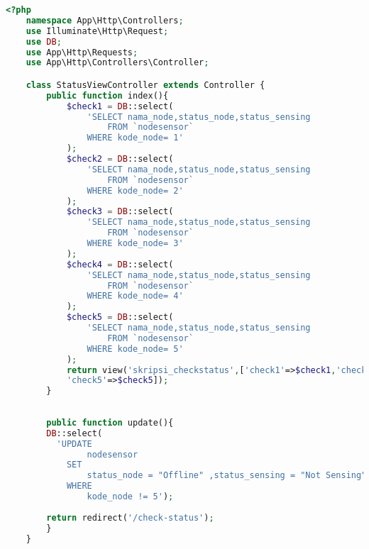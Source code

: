 \begin{lstlisting}[language=PHP, caption=StatusViewController.php]
<?php
    namespace App\Http\Controllers;
    use Illuminate\Http\Request;
    use DB;
    use App\Http\Requests;
    use App\Http\Controllers\Controller;

    class StatusViewController extends Controller {
        public function index(){
            $check1 = DB::select(
                'SELECT nama_node,status_node,status_sensing 
                    FROM `nodesensor` 
                WHERE kode_node= 1'
            );
            $check2 = DB::select(
                'SELECT nama_node,status_node,status_sensing 
                    FROM `nodesensor` 
                WHERE kode_node= 2'
            );
            $check3 = DB::select(
                'SELECT nama_node,status_node,status_sensing 
                    FROM `nodesensor` 
                WHERE kode_node= 3'
            );
            $check4 = DB::select(
                'SELECT nama_node,status_node,status_sensing 
                    FROM `nodesensor` 
                WHERE kode_node= 4'
            );
            $check5 = DB::select(
                'SELECT nama_node,status_node,status_sensing 
                    FROM `nodesensor` 
                WHERE kode_node= 5'
            );
            return view('skripsi_checkstatus',['check1'=>$check1,'check2'=>$check2,'check3'=>$check3,'check4'=>$check4,
            'check5'=>$check5]); 
        }
    
        
        public function update(){
        DB::select(
          'UPDATE 
                nodesensor 
            SET 
                status_node = "Offline" ,status_sensing = "Not Sensing" 
            WHERE
                kode_node != 5');
        
        return redirect('/check-status');
        }
    }
\end{lstlisting}

